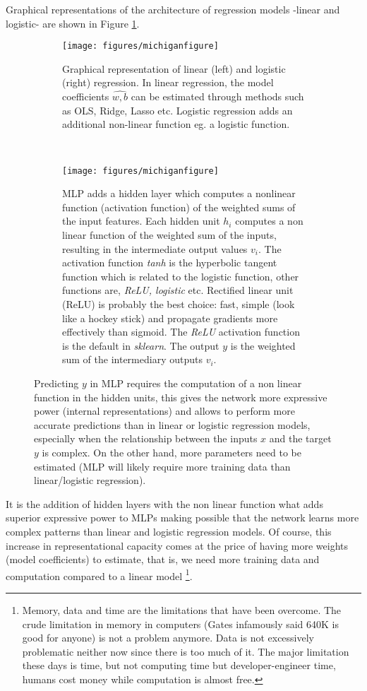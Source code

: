 \documentclass[11pt]{article}
\theoremstyle{definition}
\theoremstyle{remark}
\begin{document}
Graphical representations of the architecture of regression models -linear and logistic- are shown in Figure \ref{fig:mich}. 

\begin{figure}[H]
    \centering
    \begin{subfigure}[t]{.8\textwidth}
        \centering
        \texttt{[image: figures/michiganfigure]}
        \caption{Graphical representation of linear (left) and logistic (right) regression. In linear regression, the model coefficients $\hat{w,b}$ can be estimated through methods such as OLS, Ridge, Lasso etc. Logistic regression adds an additional non-linear function eg. a logistic function.}
    \end{subfigure}
    ~ 
    \begin{subfigure}[t]{.8\textwidth}
        \centering
        \texttt{[image: figures/michiganfigure]}
        \caption{MLP adds a hidden layer which computes a nonlinear function (activation function) of the weighted sums of the input features. Each hidden unit $h_i$ computes a non linear function of the weighted sum of the inputs, resulting in the intermediate output values $v_i$. The activation function \textit{tanh} is the hyperbolic tangent function which is related to the logistic function, other functions are, \textit{ReLU, logistic} etc. Rectified linear unit (ReLU) is probably the best choice: fast, simple (look like a hockey stick) and propagate gradients more effectively than sigmoid. The \textit{ReLU} activation function is the default in \emph{sklearn}. The output $y$ is the weighted sum of the intermediary outputs $v_i$.}
    \end{subfigure}%
    \caption{Predicting $y$ in MLP requires the computation of a non linear function in the hidden units, this gives the network more expressive power (internal representations) and allows to perform more accurate predictions than in linear or logistic regression models, especially when the relationship between the inputs $x$ and the target $y$ is complex. On the other hand, more parameters need to be estimated (MLP will likely require more training data than linear/logistic regression).} \label{fig:mich}
\end{figure}

It is the addition of hidden layers with the non linear function what adds superior expressive power to MLPs making possible that the network learns more complex patterns than linear and logistic regression models. Of course, this increase in representational capacity comes at the price of having more weights (model coefficients) to estimate, that is, we need more training data and computation compared to a linear model \footnote{Memory, data and time are the limitations that have been overcome. The crude limitation in memory in computers (Gates infamously said  640K is good for anyone) is not a problem anymore. Data is not excessively problematic neither now since there is too much of it. The major limitation these days is time, but not computing time but developer-engineer time, humans cost money while computation is almost free.}.
\end{document}
